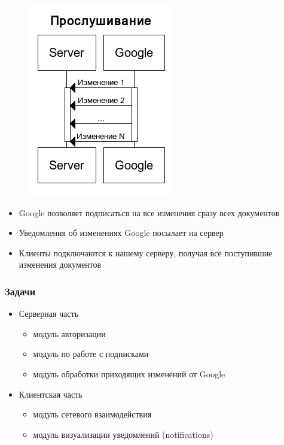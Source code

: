 \documentclass[10pt,pdf,hyperref={unicode}]{beamer}
\begin{document}
\begin{frame}
\begin{figure}[ht]
\begin{minipage}[b]{0.5\linewidth}
            \end{minipage}%
            \begin{minipage}[b]{0.5\linewidth}
                \centering
                \includegraphics[scale=0.25]{listening.png} 
            \end{minipage} 
        \end{figure}
        \begin{itemize}%
            \item	Google позволяет подписаться на все изменения сразу всех документов
            \pause
            \item   Уведомления об изменениях Google посылает на сервер
            \pause
            \item   Клиенты подключаются к нашему серверу, получая все поступившие изменения документов
        \end{itemize}
    \end{frame}

    \begin{frame}\frametitle{Задачи}
        \begin{itemize}%
        	\item Серверная часть
	        \begin{itemize}
                \item модуль авторизации
                \item модуль по работе с подписками
                \item модуль обработки приходящих изменений от Google
            \end{itemize}            
            \pause
        	\item Клиентская часть
	        \begin{itemize}
                \item модуль сетевого взаимодействия
                \item модуль визуализации уведомлений (notifications)
            \end{itemize}                        
        \end{itemize}
    \end{frame}
    
\end{document}
